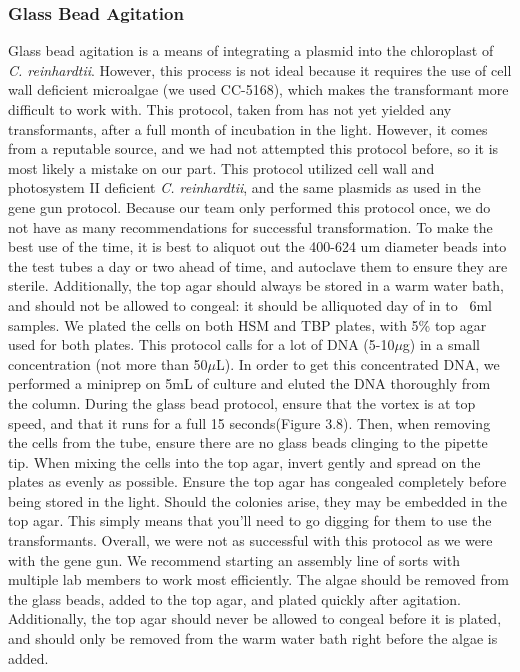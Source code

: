 \subsubsection{Glass Bead Agitation}
Glass bead agitation is a means of integrating a plasmid into the chloroplast of \textit{C. reinhardtii}. However, this process is not ideal because it requires the use of cell wall deficient microalgae (we used CC-5168), which makes the transformant more difficult to work with. This protocol, taken from \parencite{Wannathong2016} has not yet yielded any transformants, after a full month of incubation in the light. However, it comes from a reputable source, and we had not attempted this protocol before, so it is most likely a mistake on our part. This protocol utilized cell wall and photosystem II deficient \textit{C. reinhardtii}, and the same plasmids as used in the gene gun protocol. Because our team only performed this protocol once, we do not have as many recommendations for successful transformation. 
	To make the best use of the time, it is best to aliquot out the 400-624 um diameter beads into the test tubes a day or two ahead of time, and autoclave them to ensure they are sterile. Additionally, the top agar should always be stored in a warm water bath, and should not be allowed to congeal: it should be alliquoted day of in to ~6ml samples. We plated the cells on both HSM and TBP plates, with 5\% top agar used for both plates. This protocol calls for a lot of DNA (5-10$\mu$g) in a small concentration (not more than 50$\mu$L). In order to get this concentrated DNA, we performed a miniprep on 5mL of culture and eluted the DNA thoroughly from the column. During the glass bead protocol, ensure that the vortex is at top speed, and that it runs for a full 15 seconds(Figure 3.8). Then, when removing the cells from the tube, ensure there are no glass beads clinging to the pipette tip. When mixing the cells into the top agar, invert gently and spread on the plates as evenly as possible. Ensure the top agar has congealed completely before being stored in the light. Should the colonies arise, they may be embedded in the top agar. This simply means that you’ll need to go digging for them to use the transformants. 
	Overall, we were not as successful with this protocol as we were with the gene gun. We recommend starting an assembly line of sorts with multiple lab members to work most efficiently. The algae should be removed from the glass beads, added to the top agar, and plated quickly after agitation. Additionally, the top agar should never be allowed to congeal before it is plated, and should only be removed from the warm water bath right before the algae is added. 


